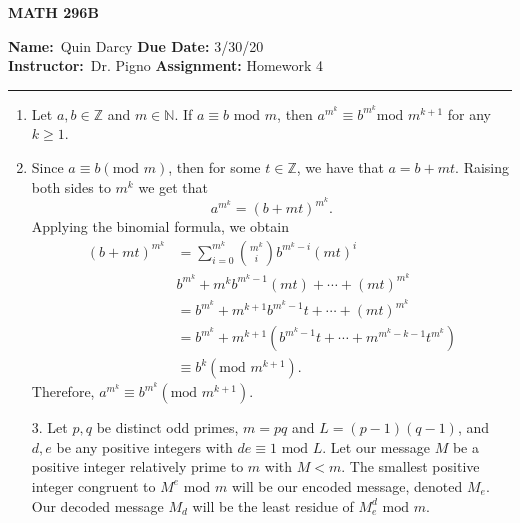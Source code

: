 \documentclass[12pt]{article}
\makeatletter
\theoremstyle{definition}
\theoremstyle{remark}
\renewenvironment{proof}[1][\proofname]{\par
  \pushQED{\qed}%
  \normalfont \topsep6\p@\@plus6\p@\relax
  \list{}{\leftmargin=0mm
          \rightmargin=4mm
          \settowidth{\itemindent}{\itshape#1}%
          \labelwidth=\itemindent
          \parsep=0pt \listparindent=\parindent 
  }
  \item[\hskip\labelsep
        \itshape
    #1\@addpunct{.}]\ignorespaces
}{%
  \popQED\endlist\@endpefalse
}
\let\oldproofname=\proofname
\renewcommand{\proofname}{\bf{\textit{\oldproofname}}}
\makeatother
\begin{document}
\thispagestyle{empty}\hline

\begin{center}
	\vspace{.4cm} {\textbf { \large MATH 296B}}
\end{center}
{\textbf{Name:}\ Quin Darcy \hspace{\fill} \textbf{Due Date:} 3/30/20   \\
{ \textbf{Instructor:}}\ Dr. Pigno \hspace{\fill} \textbf{Assignment:} Homework 4 \\ \hrule}

\justifying

    \begin{enumerate}[leftmargin=*]
        \item Let $a,b\in\mathbb{Z}$ and $m\in\mathbb{N}$. If $a\equiv b\text{ mod } m$, then $a^{m^k}\equiv b^{m^k}\text{mod }m^{k+1}$ for any $k\geq 1$.
            \begin{proof}
                Since $a\equiv b(\text{mod }m)$, then for some $t\in\mathbb{Z}$, we have that $a=b+mt$. Raising both sides to $m^k$ we get that 
                    \begin{equation*}
                        a^{m^k}=(b+mt)^{m^k}.
                    \end{equation*}
                Applying the binomial formula, we obtain
                    \begin{equation*}
                        \begin{split}
                            (b+mt)^{m^k} &= \sum\limits_{i=0}^{m^k}\binom{m^k}{i}b^{m^k-i}(mt)^i \\
                            &b^{m^k}+m^kb^{m^k-1}(mt)+\cdots+(mt)^{m^k} \\
                            &= b^{m^k}+m^{k+1}b^{m^k-1}t+\cdots+(mt)^{m^k} \\
                            &= b^{m^k}+m^{k+1}(b^{m^k-1}t+\cdots+m^{m^k-k-1}t^{m^k}) \\
                            &\equiv b^k(\text{mod }m^{k+1}).
                        \end{split}
                    \end{equation*}
                Therefore, $a^{m^k}\equiv b^{m^k}(\text{mod }m^{k+1})$.
            \end{proof}
        \item[3.] Let $p,q$ be distinct odd primes, $m=pq$ and $L=(p-1)(q-1)$, and $d,e$ be any positive integers with $de\equiv 1\text{ mod }L$. Let our message $M$ be a positive integer relatively prime to $m$ with $M<m$. The smallest positive integer congruent to $M^e\text{ mod }m$ will be our encoded message, denoted $M_e$. Our decoded message $M_d$ will be the least residue of $M^d_e\text{ mod }m$.

\end{enumerate}
\end{document}
